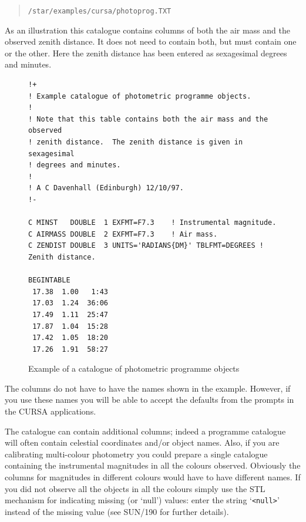 \documentclass[twoside,11pt]{article}
\newcommand{\xref}[3]{#1}
\begin{document}
\begin{enumerate}
\begin{description}
    \begin{verse}
     {\tt /star/examples/cursa/photoprog.TXT}
    \end{verse}

     As an illustration this catalogue contains columns of both the air mass
     and the observed zenith distance.  It does not need to contain both,
     but must contain one or the other.  Here the zenith distance has been
     entered as sexagesimal degrees and minutes.

\begin{figure}[htbp]

\begin{verbatim}
!+
! Example catalogue of photometric programme objects.
!
! Note that this table contains both the air mass and the observed
! zenith distance.  The zenith distance is given in sexagesimal
! degrees and minutes.
!
! A C Davenhall (Edinburgh) 12/10/97.
!-

C MINST   DOUBLE  1 EXFMT=F7.3    ! Instrumental magnitude.
C AIRMASS DOUBLE  2 EXFMT=F7.3    ! Air mass.
C ZENDIST DOUBLE  3 UNITS='RADIANS{DM}' TBLFMT=DEGREES ! Zenith distance.

BEGINTABLE
 17.38  1.00   1:43
 17.03  1.24  36:06
 17.49  1.11  25:47
 17.87  1.04  15:28
 17.42  1.05  18:20
 17.26  1.91  58:27
\end{verbatim}

\begin{quote}
\caption{Example of a catalogue of photometric programme objects
\label{PHOTOPRGCAT} }
\end{quote}

\end{figure}

     The columns do not have to have the names shown in the example.
     However, if you use these names you will be able to accept the defaults
     from the prompts in the CURSA applications.

     The catalogue can contain additional columns; indeed a programme catalogue
     will often contain celestial coordinates and/or object names.  Also, if
     you are calibrating multi-colour photometry you could prepare a single
     catalogue containing the instrumental magnitudes in all the colours
     observed.  Obviously the columns for magnitudes in different colours
     would have to have different names.  If you did not observe all the
     objects in all the colours simply use the STL mechanism for indicating
     missing (or `null') values: enter the string `\verb-<null>-' instead of
     the missing value (see \xref{SUN/190}{sun190}{} for further details).


\end{description}
\end{enumerate}
\end{document}
